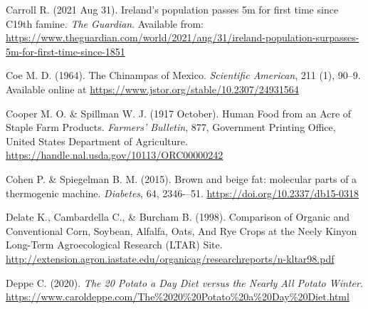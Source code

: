 \documentclass[11pt,letter]{article}
\begin{document}
\begin{thebibliography}{99}
Carroll R.
(2021 Aug 31).
Ireland’s population passes 5m for first time since C19th famine.
\textit{The Guardian}.
Available from: \url{https://www.theguardian.com/world/2021/aug/31/ireland-population-surpasses-5m-for-first-time-since-1851}


Coe M. D.
(1964).
The Chinampas of Mexico.
\textit{Scientific American}, 211 (1), 90--9.
Available online at \url{https://www.jstor.org/stable/10.2307/24931564}

Cooper  M. O. \& Spillman W. J. 
(1917 October).
Human Food from an Acre of Staple Farm Products.
\textit{Farmers' Bulletin}, 
877,
Government Printing Office, United States Department of Agriculture.
\url{https://handle.nal.usda.gov/10113/ORC00000242}

Cohen P. \& Spiegelman B. M.
(2015).
Brown and beige fat: molecular parts of a thermogenic machine.
\textit{Diabetes},
64,
2346-–51.
\url{https://doi.org/10.2337/db15-0318}

Delate K., Cambardella C., \& Burcham B.
(1998).
Comparison of Organic and Conventional Corn, 
Soybean, Alfalfa, Oats, And Rye Crops at the Neely Kinyon Long-Term Agroecological Research (LTAR) Site.
\url{http://extension.agron.iastate.edu/organicag/researchreports/n-kltar98.pdf} 


Deppe C.
(2020).
\textit{The 20 Potato a Day Diet versus the Nearly All Potato Winter}.
\url{https://www.caroldeppe.com/The\%2020\%20Potato\%20a\%20Day\%20Diet.html}


\end{thebibliography}
\end{document}
